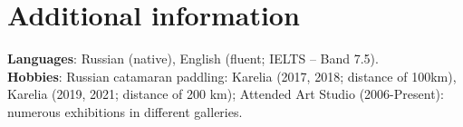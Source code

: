 \documentclass[letterpaper,11pt]{article}
\begin{document}
\section{Additional information}
\begin{itemize}[leftmargin=0.15in, label={}]
    \small{\item{
     \textbf{Languages}{: Russian (native), English (fluent; IELTS -- Band 7.5).} \\
     \textbf{Hobbies}{: Russian catamaran paddling: Karelia (2017, 2018; distance of 100km), Karelia (2019, 2021; distance of 200 km); Attended Art Studio (2006-Present): numerous exhibitions in different galleries.} \\
    }}
\end{itemize}
\end{document}
